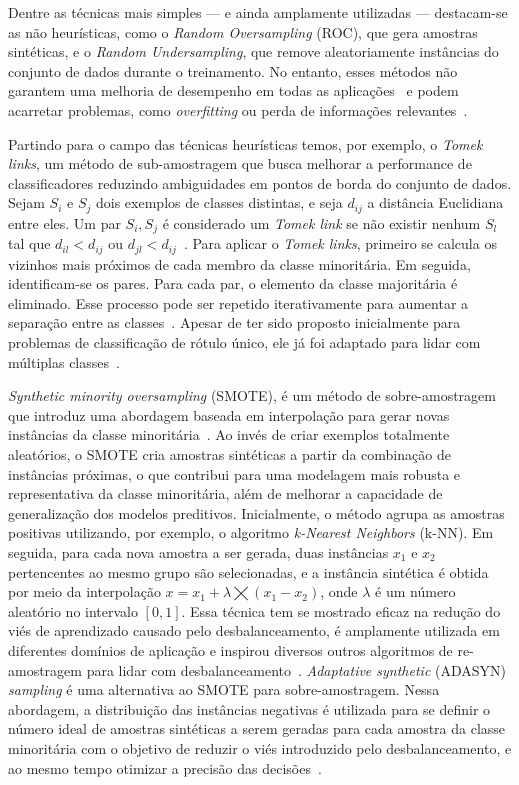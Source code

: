 Dentre as técnicas mais simples — e ainda amplamente utilizadas — destacam-se as não heurísticas, como o \textit{Random Oversampling} (ROC), que gera amostras sintéticas, e o \textit{Random Undersampling}, que remove aleatoriamente instâncias do conjunto de dados durante o treinamento. No entanto, esses métodos não garantem uma melhoria de desempenho em todas as aplicações~\cite{Yang2024} e podem acarretar problemas, como \textit{overfitting} ou perda de informações relevantes~\cite{Fernndez2018}.

Partindo para o campo das técnicas heurísticas temos, por exemplo, o \textit{Tomek links}, um método de sub-amostragem que busca melhorar a performance de classificadores reduzindo ambiguidades em pontos de borda do conjunto de dados. Sejam \(S_{i}\) e \(S_{j}\) dois exemplos de classes distintas, e seja \(d_{ij}\) a distância Euclidiana entre eles. Um par \(S_{i}, S_{j}\) é considerado um \textit{Tomek link} se não existir nenhum \(S_{l}\) tal que \(d_{il} < d_{ij}\) ou \(d_{jl} < d_{ij}\)~\cite{Batista2004}. Para aplicar o \textit{Tomek links}, primeiro se calcula os vizinhos mais próximos de cada membro da classe minoritária. Em seguida, identificam-se os pares. Para cada par, o elemento da classe majoritária é eliminado. Esse processo pode ser repetido iterativamente para aumentar a separação entre as classes~\cite{Arichandrapandian2024}. Apesar de ter sido proposto inicialmente para problemas de classificação de rótulo único, ele já foi adaptado para lidar com múltiplas classes~\cite{Pereira2020}.

\textit{Synthetic minority oversampling} (SMOTE), é um método de sobre-amostragem que introduz uma abordagem baseada em interpolação para gerar novas instâncias da classe minoritária~\cite{Wei2025}. Ao invés de criar exemplos totalmente aleatórios, o SMOTE cria amostras sintéticas a partir da combinação de instâncias próximas, o que contribui para uma modelagem mais robusta e representativa da classe minoritária, além de melhorar a capacidade de generalização dos modelos preditivos. Inicialmente, o método agrupa as amostras positivas utilizando, por exemplo, o algoritmo \textit{k-Nearest Neighbors} (k-NN). Em seguida, para cada nova amostra a ser gerada, duas instâncias \(x_{1}\) e \(x_{2}\) pertencentes ao mesmo grupo são selecionadas, e a instância sintética é obtida por meio da interpolação \(x = x_{1} + \lambda \bigtimes (x_{1} - x_{2})\), onde \(\lambda\) é um número aleatório no intervalo \([0, 1]\). Essa técnica tem se mostrado eficaz na redução do viés de aprendizado causado pelo desbalanceamento, é amplamente utilizada em diferentes domínios de aplicação e inspirou diversos outros algoritmos de re-amostragem para lidar com desbalanceamento~\cite{Fernndez2018}. \textit{Adaptative synthetic} (ADASYN) \textit{sampling} é uma alternativa ao SMOTE para sobre-amostragem. Nessa abordagem, a distribuição das instâncias negativas é utilizada para se definir o número ideal de amostras sintéticas a serem geradas para cada amostra da classe minoritária com o objetivo de reduzir o viés introduzido pelo desbalanceamento, e ao mesmo tempo otimizar a precisão das decisões~\cite{He2008}.

